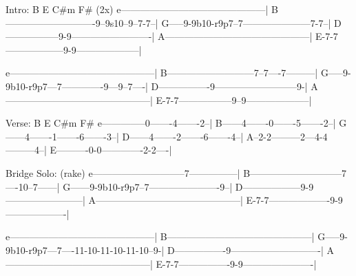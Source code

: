 \begin{lsttab}
Intro:    B     E   C#m   F#            (2x)
e---------------------------------------------|
B----------------------------9--9s10--9--7-7--|
G-----9-9b10-r9p7--7---------------------7-7--|
D-----------------9-9-------------------------|
A---------------------------------------------|
E-7-7------------------9-9--------------------|

e---------------------------------------------|
B---------------------------7--7----7---------|
G-----9-9b10-r9p7---7-------------9---9--7----|
D----------------9--------------------------9-|
A---------------------------------------------|
E-7-7-----------------9--9--------------------|


Verse: B        E       C#m       F#
e--------------0-------4-------2--|
B------4-------0-------5-------2--|
G------4-------1-------6-------3--|
D------4-------2-------6-------4--|
A--2-2---------2---4-4---------4--|
E----------0-0-------------2-2----|


Bridge Solo:                (rake)
e-----------------------------7---------------|
B-----------------------------7----10--7------|
G------9-9b10-r9p7--7----------------------9--|
D------------------9-9------------------------|
A---------------------------------------------|
E-7-7-------------------9-9-------------------|

e---------------------------------------------|
B---------------------------------------------|
G-----9-9b10-r9p7---7----11-10-11-10-11-10--9-|
D----------------9----------------------------|
A---------------------------------------------|
E-7-7----------------9-9----------------------|
\end{lsttab}
\newpage

\begin{comment}
Bridge chords
    E         B    C    C#   F#   F
e---0----7----2----3----4----2----1|
B---0----9----4----5----6----2----1|
G---2----9----4----5----6----3----2|
D---2-or-9----4----5----6----4----3|
A---1----7----2----3----4----4----3|
E---0------------------------2----1|
\end{lsttab}
\end{comment}

